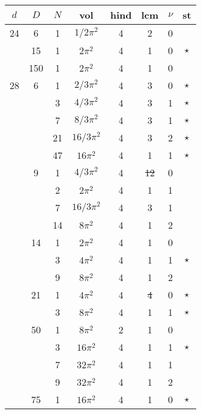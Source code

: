\documentclass[12pt]{amsart}
\providecommand{\DIFadd}[1]{{\protect\color{blue}\uwave{#1}}} %
\providecommand{\DIFdel}[1]{{\protect\color{red}\sout{#1}}}                      %
\providecommand{\DIFaddbegin}{} %
\providecommand{\DIFaddend}{} %
\providecommand{\DIFdelbegin}{} %
\providecommand{\DIFdelend}{} %
\begin{document}
\begin{tabular}{ccc|ccccc}
$d$ & $D$ & $N$ & vol & hind & lcm & $\nu$ & st\\
\hline
24 & 6 & 1 & \DIFdelbegin \DIFdel{$1/2\pi^2$ }\DIFdelend \DIFaddbegin \DIFadd{$(1/2)\pi^2$ }\DIFaddend & 4 & 2 & 0 &  \\
 & 15 & 1 & $2\pi^2$ & 4 & 1 & 0 & $\star$ \\
 & 150 & 1 & $2\pi^2$ & 4 & 1 & 0 &  \\
28 & 6 & 1 & \DIFdelbegin \DIFdel{$2/3\pi^2$ }\DIFdelend \DIFaddbegin \DIFadd{$(2/3)\pi^2$ }\DIFaddend & 4 & 3 & 0 & $\star$ \\
 &  & 3 & \DIFdelbegin \DIFdel{$4/3\pi^2$ }\DIFdelend \DIFaddbegin \DIFadd{$(4/3)\pi^2$ }\DIFaddend & 4 & 3 & 1 & $\star$ \\
 &  & 7 & \DIFdelbegin \DIFdel{$8/3\pi^2$ }\DIFdelend \DIFaddbegin \DIFadd{$(8/3)\pi^2$ }\DIFaddend & 4 & 3 & 1 & $\star$ \\
 &  & 21 & \DIFdelbegin \DIFdel{$16/3\pi^2$ }\DIFdelend \DIFaddbegin \DIFadd{$(16/3)\pi^2$ }\DIFaddend & 4 & 3 & 2 & $\star$ \\
 &  & 47 & $16\pi^2$ & 4 & 1 & 1 & $\star$ \\
 & 9 & 1 & \DIFdelbegin \DIFdel{$4/3\pi^2$ }\DIFdelend \DIFaddbegin \DIFadd{$(4/3)\pi^2$ }\DIFaddend & 4 & \DIFdelbegin \DIFdel{12 }\DIFdelend \DIFaddbegin \DIFadd{6 }\DIFaddend & 0 &  \\
 &  & 2 & $2\pi^2$ & 4 & 1 & 1 &  \\
 &  & 7 & \DIFdelbegin \DIFdel{$16/3\pi^2$ }\DIFdelend \DIFaddbegin \DIFadd{$(16/3)\pi^2$ }\DIFaddend & 4 & 3 & 1 &  \\
 &  & 14 & $8\pi^2$ & 4 & 1 & 2 &  \\
 & 14 & 1 & $2\pi^2$ & 4 & 1 & 0 &  \\
 &  & 3 & $4\pi^2$ & 4 & 1 & 1 & $\star$ \\
 &  & 9 & $8\pi^2$ & 4 & 1 & 2 &  \\
 & 21 & 1 & $4\pi^2$ & 4 & \DIFdelbegin \DIFdel{4 }\DIFdelend \DIFaddbegin \DIFadd{2 }\DIFaddend & 0 & $\star$ \\
 &  & 3 & $8\pi^2$ & 4 & 1 & 1 & $\star$ \\
 & 50 & 1 & $8\pi^2$ & 2 & 1 & 0 &  \\
 &  & 3 & $16\pi^2$ & 4 & 1 & 1 & $\star$ \\
 &  & 7 & $32\pi^2$ & 4 & 1 & 1 &  \\
 &  & 9 & $32\pi^2$ & 4 & 1 & 2 &  \\
 & 75 & 1 & $16\pi^2$ & 4 & 1 & 0 & $\star$ \\

\end{tabular}
\end{document}
